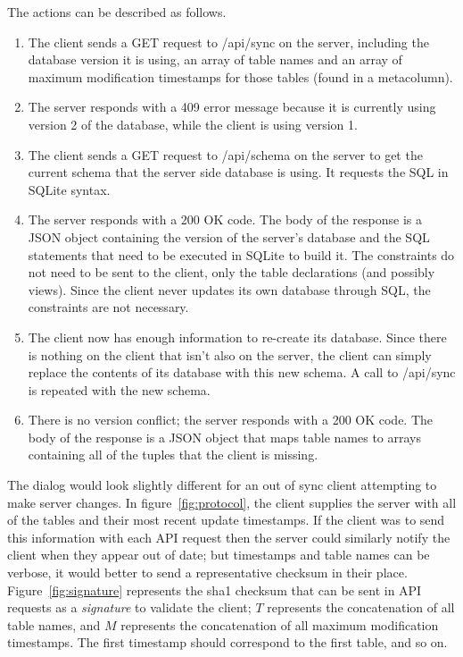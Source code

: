 The actions can be described as follows. 

\begin{enumerate}

\item The client sends a GET request to /api/sync on the server, including the database version it is using, an array of table names and an array of maximum modification timestamps for those tables (found in a metacolumn).

\item The server responds with a 409 error message because it is currently using version 2 of the database, while the client is using version 1.

\item The client sends a GET request to /api/schema on the server to get the current schema that the server side database is using. It requests the SQL in SQLite syntax.

\item The server responds with a 200 OK code. The body of the response is a JSON object containing the version of the server's database and the SQL statements that need to be executed in SQLite to build it. The constraints do not need to be sent to the client, only the table declarations (and possibly views). Since the client never updates its own database through SQL, the constraints are not necessary. 

\item The client now has enough information to re-create its database. Since there is nothing on the client that isn't also on the server, the client can simply replace the contents of its database with this new schema. A call to /api/sync is repeated with the new schema. 

\item There is no version conflict; the server responds with a 200 OK code. The body of the response is a JSON object that maps table names to arrays containing all of the tuples that the client is missing. 

\end{enumerate}


The dialog would look slightly different for an out of sync client attempting to
make server changes. In figure~\ref{fig:protocol}, the client supplies the
server with all of the tables and their most recent update timestamps. If the
client was to send this information with each API request then the server could
similarly notify the client when they appear out of date; but timestamps and
table names can be verbose, it would better to send a representative checksum in
their place. Figure~\ref{fig:signature} represents the sha1 checksum that can be
sent in API requests as a \textit{signature} to validate the client; $T$
represents the concatenation of all table names, and $M$ represents the
concatenation of all maximum modification timestamps. The first timestamp should
correspond to the first table, and so on.

